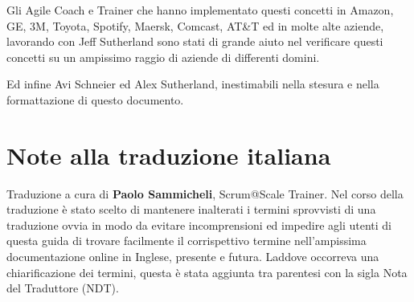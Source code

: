\documentclass[12pt,a4paper,parskip=full]{scrartcl}
\begin{document}
Gli Agile Coach e Trainer che hanno implementato questi concetti in Amazon, GE, 3M, Toyota, Spotify, Maersk, Comcast, AT\&T ed in molte alte aziende, lavorando con Jeff Sutherland sono stati di grande aiuto nel verificare questi concetti su un ampissimo raggio di aziende di differenti domini.

Ed infine Avi Schneier ed Alex Sutherland, inestimabili nella stesura e nella formattazione di questo documento.

\section{Note alla traduzione italiana}
Traduzione a cura di \textbf{Paolo Sammicheli}, Scrum@Scale Trainer. Nel corso della traduzione è stato scelto di mantenere inalterati i termini sprovvisti di una traduzione ovvia in modo da evitare incomprensioni ed impedire agli utenti di questa guida di trovare facilmente il corrispettivo termine nell'ampissima documentazione online in Inglese, presente e futura. Laddove occorreva una chiarificazione dei termini, questa è stata aggiunta tra parentesi con la sigla Nota del Traduttore (NDT).

\pagebreak

\printbibliography
\end{document}
